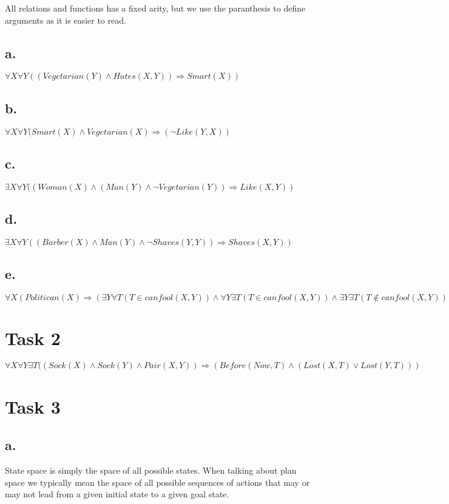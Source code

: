 \documentclass[a4paper, english, 11pt]{article}
\begin{document}
All relations and functions has a fixed arity, but we use the paranthesis to
define arguments as it is easier to read.

\subsection*{a.}

$\forall X \forall Y ((Vegetarian(Y) \wedge  Hates(X, Y)) \Rightarrow
Smart(X))$

\subsection*{b.}

$\forall X \forall Y (Smart(X) \wedge Vegetarian(X) \Rightarrow (\neg
Like(Y, X))$

\subsection*{c.}

$\exists X \forall Y ((Woman(X) \wedge (Man(Y) \wedge \neg Vegetarian(Y))
\Rightarrow Like(X, Y))$

\subsection*{d.}

$\exists X \forall Y ((Barber(X) \wedge Man(Y) \wedge \neg Shaves(Y, Y))
\Rightarrow Shaves(X, Y))$

\subsection*{e.}

$\forall X(Politican(X) \Rightarrow (\exists Y \forall T
(T \in canfool(X, Y)) \wedge \forall Y \exists T (T \in canfool(X, Y)) \wedge
\exists Y \exists T (T \not\in canfool(X, Y))))$

\section*{Task 2}

$\forall X \forall Y \exists T ((Sock(X) \wedge Sock(Y) \wedge Pair(X, Y))
\Rightarrow (Before(Now, T) \wedge (Lost(X, T) \vee Lost(Y, T)))$

\section*{Task 3}
\subsection*{a.}
State space is simply the space of all possible states. When talking about plan
space we typically mean the space of all possible sequences of actions that
may or may not lead from a given initial state to a given goal state.
\end{document}

